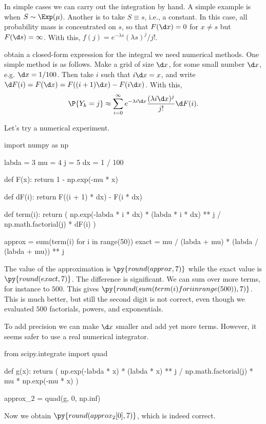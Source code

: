 In simple cases we can carry out the integration by hand.
A simple example is when $S\sim \Exp(\mu)$. Another is to take $S\equiv s$, i.e., a constant.
In this case, all probability mass is concentrated on $s$, so that $F(\d x) = 0$ for $x\neq s$ but $F(\d s) = \infty$.
With this, $f(j) = e^{-\lambda s}(\lambda s)^j/{j!}$.

 obtain a closed-form expression for the integral we need numerical methods.
One simple method is as follows.
Make a grid of size $\d x$, for some small number $\d x$, e.g.
$\d x=1/100$. Then  take $i$ such that $i \d x = x$, and  write $\d F(i ) =  F(\d x) = F((i+1)\d x) - F(i \d x)$.
With this,
 \begin{equation*}
 \P{Y_k = j}  \approx \sum_{i=0}^\infty e^{-\lambda i \d x}\frac{(\lambda i\d x)^j}{j!} \d F(i).
\end{equation*}

Let's try a numerical experiment.
\begin{pyblock}
import numpy as np

labda = 3
mu = 4
j = 5
dx = 1 / 100


def F(x):
    return 1 - np.exp(-mu * x)


def dF(i):
    return F((i + 1) * dx) - F(i * dx)


def term(i):
    return (
        np.exp(-labda * i * dx)
        * (labda * i * dx) ** j
        / np.math.factorial(j)
        * dF(i)
    )


approx = sum(term(i) for i in range(50))
exact = mu / (labda + mu) * (labda / (labda + mu)) ** j
\end{pyblock}
The value of the approximation is $\py{round(approx, 7)}$ while the exact value is $\py{round(exact, 7)}$.
The difference is significant.
We can sum over more terms, for instance to $500$.
This gives $\py{round(sum(term(i) for i in range(500)),7)}$.
This is much better, but still the second digit is not correct, even though we evaluated $500$ factorials, powers, and exponentials.

To add precision we can make $\d x$ smaller and add yet more terms.
However, it seems safer to use a real numerical integrator.
\begin{pyblock}
from scipy.integrate import quad

def g(x):
    return (
        np.exp(-labda * x)
        * (labda * x) ** j
        / np.math.factorial(j)
        * mu
        * np.exp(-mu * x)
    )

approx_2 = quad(g, 0, np.inf)
\end{pyblock}
Now we obtain $\py{round(approx_2[0], 7)}$, which is indeed correct.


